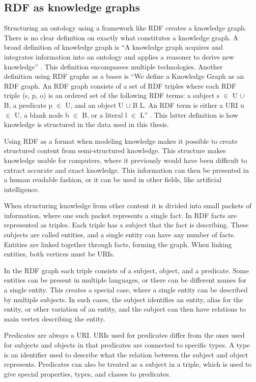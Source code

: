 \subsection{RDF as knowledge graphs}
Structuring an ontology using a framework like RDF creates a knowledge graph. There is no clear definition on exactly what constitutes a knowledge graph. A broad definition of knowledge graph is ``A knowledge graph acquires and integrates information into an ontology and applies a reasoner to derive new knowledge'' \cite{KGDef}. This definition encompasses multiple technologies. Another definition using RDF graphs as a bases is ``We define a Knowledge Graph as an RDF graph. An RDF graph consists of a set of RDF triples where each RDF triple (s, p, o) is an ordered set of the following RDF terms: a subject s $\in$ U $\cup$ B, a predicate p $\in$ U, and an object U $\cup$ B  L. An RDF term is either a URI u $\in$ U, a blank node b $\in$ B, or a literal l $\in$ L'' \cite{KGDefYago}. This latter definition is how knowledge is structured in the data used in this thesis.

Using RDF as a format when modeling knowledge makes it possible to create structured content from semi-structured knowledge. This structure makes knowledge usable for computers, where it previously would have been difficult to extract accurate and exact knowledge. This information can then be presented in a human readable fashion, or it can be used in other fields, like artificial intelligence.

When structuring knowledge from other content it is divided into small packets of information, where one such packet represents a single fact. In RDF facts are represented as triples. Each triple has a subject that the fact is describing. These subjects are called entities, and a single entity can have any number of facts. Entities are linked together through facts, forming the graph. When linking entities, both vertices must be URIs.

In the RDF graph each triple consists of a subject, object, and a predicate. Some entities can be present in multiple languages, or there can be different names for a single entity. This creates a special case, where a single entity can be described by multiple subjects. In such cases, the subject identifies an entity, alias for the entity, or other variation of an entity, and the subject can then have relations to main vertex describing the entity.

Predicates are always a URI. URIs used for predicates differ from the ones used for subjects and objects in that predicates are connected to specific types. A type is an identifier used to describe what the relation between the subject and object represents. Predicates can also be treated as a subject in a triple, which is used to give special properties, types, and classes to predicates.

